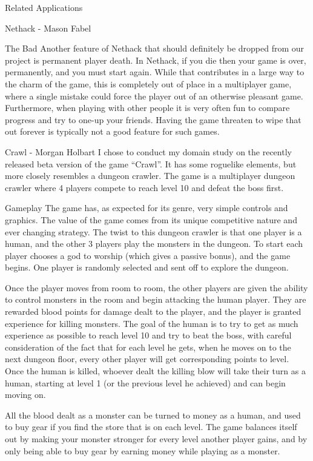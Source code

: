 \documentclass[12pt]{report}
\begin{document}
\begin{section}{Related Applications}
\begin{subsection}{Nethack - Mason Fabel}
\begin{subsubsection}{The Bad}
Another feature of Nethack that should definitely be dropped from our
project is permanent player death. In Nethack, if you die then your game is
over, permanently, and you must start again. While that contributes in a
large way to the charm of the game, this is completely out of place in a
multiplayer game, where a single mistake could force the player out of an
otherwise pleasant game. Furthermore, when playing with other people it
is very often fun to compare progress and try to one-up your friends.
Having the game threaten to wipe that out forever is typically not a good
feature for such games.
\end{subsubsection}

\end{subsection}

\begin{subsection}{Crawl - Morgan Holbart}
I chose to conduct my domain study on the recently released beta version
of the game ``Crawl''. It has some roguelike elements, but more closely
resembles a dungeon crawler. The game is a multiplayer dungeon
crawler where 4 players compete to reach level 10 and defeat the boss
first.

\begin{subsubsection}{Gameplay}
The game has, as expected for its genre, very simple controls and
graphics. The value of the game comes from its unique competitive nature
and ever
changing strategy. The twist to this dungeon crawler is that one player
is a human, and the other 3 players play the monsters in the dungeon. To
start each player chooses a god to worship (which gives a passive bonus),
and the game begins. One player is randomly selected and sent off to
explore the dungeon.

Once the player moves from room to room, the other players are given the
ability to control monsters in the room and begin attacking the human
player. They are rewarded blood points for damage dealt to the player, and
the player is granted experience for killing monsters. The goal of the
human is to try to get as much experience as possible to reach level 10
and try to beat the boss, with careful consideration of the fact that for
each level he gets, when he moves on to the next dungeon floor, every
other player will get corresponding points to level.
Once the human is killed, whoever dealt the killing blow
will take their turn as a human, starting at level 1 (or the previous level he
achieved) and can begin moving on.

All the blood dealt as a monster can be turned to money as a human, and
used to buy gear if you find the store that is on each level. The game
balances itself out by making your monster stronger for every level
another player gains, and by only being able to buy gear by earning money
while playing as a monster.
\end{subsubsection}


\end{subsection}
\end{section}
\end{document}
